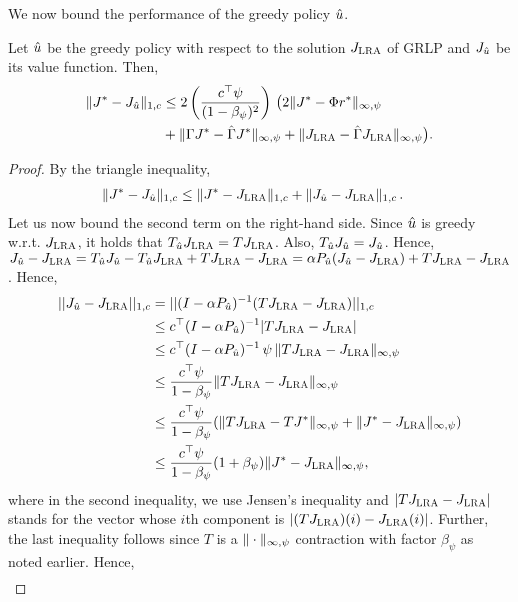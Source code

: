 We now bound the performance of the greedy policy $\hat{u}$.
\begin{theorem}
\label{polthe}
Let $\hat{u}$ be the greedy policy with respect to the solution $J_{\text{\sc LRA}}$ of GRLP and $J_{\hat{u}}$ be its value function.
Then,
\begin{align}\label{polthebnd}
\norm{J^* - J_{\hu}}_{1,c}
&\leq 2\left(\frac{c^\top \psi}{(1-\beta_{\psi})^2}\right)\, \big( 2\norm{J^*-\Phi r^*}_{\mn}
\nn\\&
+\norm{\Gamma J^*-\hg J^*}_{\mn}+\norm{\hj-\hg\hj}_{\mn}\big).
\end{align}
\end{theorem}
\begin{proof}
By the triangle inequality,
\begin{align*}
\|J^*-J_{\hat{u}}\|_{1,c}&\leq \|J^*-J_{\text{\sc LRA}}\|_{1,c}+\|J_{\hat{u}}-J_{\text{\sc LRA}}\|_{1,c}\,.
\end{align*}
Let us now bound the second term on the right-hand side.
Since $\hat{u}$ is greedy w.r.t. $J_{\text{\sc LRA}}$, it holds that $T_{\hat{u}} J_{\text{\sc LRA}} = T J_{\text{\sc LRA}}$.
Also, $T_{\hat{u}} J_{\hat{u}} = J_{\hat{u}}$.
Hence, $J_{\hat{u}} - J_{\text{\sc LRA}} = T_{\hat{u}} J_{\hat{u}} - T_{\hat{u}} J_{\text{\sc LRA}} + T J_{\text{\sc LRA}} - J_{\text{\sc LRA}}
=\alpha P_{\hat{u}} (J_{\hat{u}}- J_{\text{\sc LRA}}) + TJ_{\text{\sc LRA}} - J_{\text{\sc LRA}}$.
Hence,
\begin{align}\label{polderv}
||J_{\hu}-\hj||_{1,c}\nn
&=||(I-\alpha P_{\hu})^{-1}(T\hj-\hj)||_{1,c}\nn\\
&\leq c^\top(I-\alpha P_{\hu})^{-1}|T\hj-\hj|\nn\\
&\leq c^\top (I-\alpha P_{\hu})^{-1} \,\psi\, \norm{T\hj-\hj}_{\mn}\nn\\
&\leq \frac{c^\top \psi}{1-\beta_{\psi}}\norm{T\hj-\hj}_{\mn}\nn\\
&\leq \frac{c^\top \psi}{1-\beta_{\psi}}(\norm{T\hj-TJ^*}_{\mn} +\norm{J^*- \hj}_{\mn})\nn\\
&\leq \frac{c^\top \psi}{1-\beta_{\psi}}(1+\beta_{\psi})\norm{J^*- \hj}_{\mn},
\end{align}
where in the second inequality, we use Jensen's inequality and $|TJ_{\text{\sc LRA}} - J_{\text{\sc LRA}}|$ stands for the 
vector whose $i$th component is $|(TJ_{\text{\sc LRA}})(i) - J_{\text{\sc LRA}}(i)|$. Further, the last inequality follows
since $T$ is a $\|\cdot\|_{\infty,\psi}$ contraction with factor $\beta_{\psi}$ as noted earlier.
Hence,
\begin{align}

\end{align}
\end{proof}
